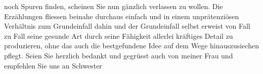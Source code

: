 \begin{ledgroupsized}[t]{13cm}
                    noch Spuren finden, scheinen Sie nun gänzlich verlassen zu wollen. Die
                    Erzählungen fliessen beinahe durchaus einfach und in einem unprätenziösen
                    Verhältnis zum Grundeinfall dahin und der Grundeinfall selbst erweist von Fall
                    zu Fall seine gesunde Art durch seine Fähigkeit allerlei kräftiges Detail zu
                    produzieren, ohne das auch die bestgefundene Idee auf dem Wege hinauszusiechen
                    pflegt.\pend
           \pstart
           Seien Sie herzlich bedankt und gegrüsst auch von meiner Frau und empfehlen Sie uns an Schwester\pend
           
         
         \endnumbering{}\end{ledgroupsized}  \newcommand{\dateiname}{L01940}\newcommand{\titel}{Arthur Schnitzler an Max Mell, 28. 6. 1910}\newcommand{\editorInnen}{Martin Anton Müller und Gerd-Hermann Susen}
      